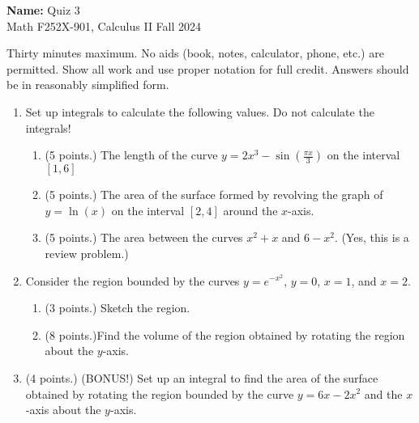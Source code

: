 \documentclass[12pt]{article}
\newcommand{\ds}{\displaystyle}
\newcommand{\points}[1]{(#1 points.)}		%
\begin{document}
\pagestyle{plain}

\noindent \textbf{Name:} \underline{\hspace{15em}}		\hfill	Quiz 3 \\
           Math F252X-901, Calculus II  			\hfill	Fall 2024 	

                \vspace{1cm}
                
Thirty minutes maximum. No aids (book, notes,
calculator, phone, etc.) are permitted. Show all work and use proper
notation for full credit. Answers should be in reasonably simplified
form.

\begin{enumerate}

\item Set up integrals to calculate the following values. Do not
  calculate the integrals!
  \begin{enumerate}
    
  \item \points{5} The length of the curve $y=2x^3-\sin(\frac{\pi x}{3})$ on the
    interval $[1,6]$
    \vfill

  \item \points{5} The area of the surface formed by revolving the graph of $y =
    \ln(x)$ on the interval $[2,4]$ around the $x$-axis.
    \vfill

  \item \points{5} The area between the curves $x^2+x$ and $6-x^2$. (Yes, this is
    a review problem.)
    \vfill
    \end{enumerate}

    \newpage

\item Consider the region bounded by the curves $\ds y=e^{-x^2}$, $y=0$,
  $x=1$, and $x=2$.
  \begin{enumerate}
  \item \points{3} Sketch the region.
    \vfill

  \item \points{8}Find the volume of the region obtained by rotating the region
    about the $y$-axis.
    \vfill
  \end{enumerate}

  \newpage

\item \points{4} (BONUS!) Set up an integral to find the area of the surface
  obtained by rotating the region bounded by the curve $y=6x-2x^2$ and
  the $x$-axis about the $y$-axis.
    
\end{enumerate}
\end{document}
